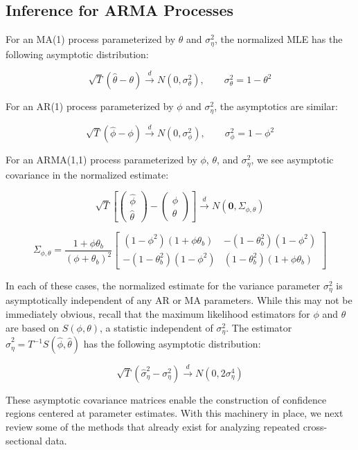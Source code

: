 \subsection{Inference for ARMA Processes}

For an MA(1) process parameterized by $\theta$ and $\sigma_\eta^2$, the normalized MLE has the following asymptotic distribution:


\begin{equation}
    \label{avar_ma1}
    \sqrt{T}(\hat{\theta} - \theta) \xrightarrow{d}N(0,\sigma_\theta^2),\qquad \sigma_\theta^2 = 1 - \theta^2
\end{equation}

For an AR(1) process parameterized by $\phi$ and $\sigma_\eta^2$, the asymptotics are similar:

\begin{equation}
    \label{avar_ma1}
    \sqrt{T}(\hat{\phi} - \phi) \xrightarrow{d} N(0,\sigma_\phi^2),\qquad \sigma_\phi^2 = 1 - \phi^2
\end{equation}
 
For an ARMA(1,1) process parameterized by $\phi$, $\theta$, and $\sigma_\eta^2$, we see asymptotic covariance in the normalized estimate:



$$ \sqrt{T}\left[\left(\begin{array}{c}
     \hat{\phi}  \\
      \hat{\theta}
\end{array}\right)-\left(\begin{array}{c}
     \phi  \\
     \theta
\end{array}\right)\right] \xrightarrow{d} N(\mathbf{0},\Sigma_{\phi,\theta})$$

\begin{equation}
\label{eq:Sigma_phitheta}
\Sigma_{\phi,\theta} = \frac{1 + \phi\theta_b}{(\phi + \theta_b)^{2}} \left[ \begin{array}{cc}
    {(1 - \phi^2)(1 + \phi\theta_b)} & {-(1 - \theta_b^2)(1 - \phi^2)} \\
    {-(1 - \theta_b^2)(1 - \phi^2)} & {(1 - \theta_b^2)(1 + \phi\theta_b)}  
\end{array} \right] 
\end{equation}

In each of these cases, the normalized estimate for the variance parameter $\sigma_\eta^2$ is asymptotically independent of any AR or MA parameters. While this may not be immediately obvious, recall that the maximum likelihood estimators for $\phi$ and $\theta$ are based on $S(\phi,\theta)$, a statistic independent of $\sigma_\eta^2$. The estimator $\hat{\sigma}_\eta^2 = T^{-1}S(\hat{\phi},\hat{\theta})$  has the following  asymptotic distribution:

$$ \sqrt{T}(\hat{\sigma}_\eta^2 - \sigma_\eta^2) \xrightarrow{d} N(0,2\sigma_\eta^4)$$

These asymptotic covariance matrices enable the construction of confidence regions centered at parameter estimates. With this machinery in place, we next review some of the methods that already exist for analyzing repeated cross-sectional data.




